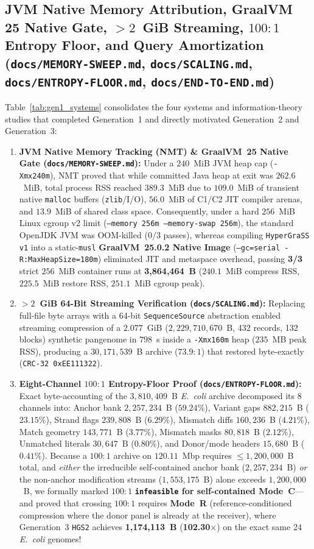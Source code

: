 \documentclass[10pt]{article}
\theoremstyle{definition}
\begin{document}
\subsection{JVM Native Memory Attribution, GraalVM 25 Native Gate, $>2$~GiB Streaming, $100:1$ Entropy Floor, and Query Amortization (\texttt{docs/MEMORY-SWEEP.md}, \texttt{docs/SCALING.md}, \texttt{docs/ENTROPY-FLOOR.md}, \texttt{docs/END-TO-END.md})}

Table~\ref{tab:gen1_systems} consolidates the four systems and information-theory studies that completed Generation~1 and directly motivated Generation~2 and Generation~3:
\begin{enumerate}
  \item \textbf{JVM Native Memory Tracking (NMT) \& GraalVM~25 Native Gate (\texttt{docs/MEMORY-SWEEP.md}):} Under a $240$~MiB JVM heap cap (\texttt{-Xmx240m}), NMT proved that while committed Java heap at exit was $262.6$~MiB, total process RSS reached $389.3$~MiB due to $109.0$~MiB of transient native \texttt{malloc} buffers (\texttt{zlib}/I/O), $56.0$~MiB of C1/C2 JIT compiler arenas, and $13.9$~MiB of shared class space. Consequently, under a hard $256$~MiB Linux cgroup v2 limit (\texttt{--memory 256m --memory-swap 256m}), the standard OpenJDK JVM was OOM-killed ($0/3$ passes), whereas compiling \texttt{HyperGraSS v1} into a static-\texttt{musl} \textbf{GraalVM~25.0.2 Native Image} (\texttt{--gc=serial -R:MaxHeapSize=180m}) eliminated JIT and metaspace overhead, passing \textbf{3/3} strict $256$~MiB container runs at \textbf{3,864,464~B} ($240.1$~MiB compress RSS, $225.5$~MiB restore RSS, $251.1$~MiB cgroup peak).
  \item \textbf{$>2$~GiB 64-Bit Streaming Verification (\texttt{docs/SCALING.md}):} Replacing full-file byte arrays with a 64-bit \texttt{SequenceSource} abstraction enabled streaming compression of a $2.077$~GiB ($2,229,710,670$~B, 432 records, 132 blocks) synthetic pangenome in $798$~s inside a \texttt{-Xmx160m} heap ($235$~MB peak RSS), producing a $30,171,539$~B archive ($73.9:1$) that restored byte-exactly (\texttt{CRC-32 0xEE111322}).
  \item \textbf{Eight-Channel $100:1$ Entropy-Floor Proof (\texttt{docs/ENTROPY-FLOOR.md}):} Exact byte-accounting of the $3,810,409$~B \textit{E.~coli} archive decomposed its 8 channels into: Anchor bank $2,257,234$~B ($59.24\%$), Variant gaps $882,215$~B ($23.15\%$), Strand flags $239,808$~B ($6.29\%$), Mismatch diffs $160,236$~B ($4.21\%$), Match geometry $143,771$~B ($3.77\%$), Mismatch masks $80,818$~B ($2.12\%$), Unmatched literals $30,647$~B ($0.80\%$), and Donor/mode headers $15,680$~B ($0.41\%$). Because a $100:1$ archive on $120.11$~Mbp requires $\le 1,200,000$~B total, and \emph{either} the irreducible self-contained anchor bank ($2,257,234$~B) \emph{or} the non-anchor modification streams ($1,553,175$~B) alone exceeds $1,200,000$~B, we formally marked $100:1$ \textbf{\texttt{infeasible} for self-contained Mode~C}---and proved that crossing $100:1$ requires \textbf{Mode~R} (reference-conditioned compression where the donor panel is already at the receiver), where Generation~3 \texttt{HGS2} achieves \textbf{1,174,113~B} (\textbf{102.30$\times$}) on the exact same 24 \textit{E.~coli} genomes!

\end{enumerate}
\end{document}
